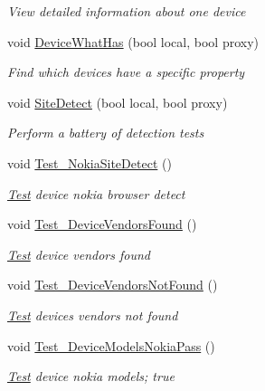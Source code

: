 \begin{DoxyCompactItemize}
\begin{DoxyCompactList}\small\item\em View detailed information about one device \end{DoxyCompactList}\item 
void \hyperlink{class_h_d3_1_1_test_1_1_h_d3_test_a60e604c7c80fe95810989db32be9a68c}{Device\+What\+Has} (bool local, bool proxy)
\begin{DoxyCompactList}\small\item\em Find which devices have a specific property \end{DoxyCompactList}\item 
void \hyperlink{class_h_d3_1_1_test_1_1_h_d3_test_a7574fbc39a251aa2d73b923c41612db5}{Site\+Detect} (bool local, bool proxy)
\begin{DoxyCompactList}\small\item\em Perform a battery of detection tests \end{DoxyCompactList}\item 
void \hyperlink{class_h_d3_1_1_test_1_1_h_d3_test_ac33dd7669508077165ee77c241904f6a}{Test\+\_\+\+Nokia\+Site\+Detect} ()
\begin{DoxyCompactList}\small\item\em \hyperlink{namespace_h_d3_1_1_test}{Test} device nokia browser detect \end{DoxyCompactList}\item 
void \hyperlink{class_h_d3_1_1_test_1_1_h_d3_test_abdbc11cf1956c40b5f0894f05654ec70}{Test\+\_\+\+Device\+Vendors\+Found} ()
\begin{DoxyCompactList}\small\item\em \hyperlink{namespace_h_d3_1_1_test}{Test} device vendors found \end{DoxyCompactList}\item 
void \hyperlink{class_h_d3_1_1_test_1_1_h_d3_test_a474e2044227b1931e1d29127b3e4e3be}{Test\+\_\+\+Device\+Vendors\+Not\+Found} ()
\begin{DoxyCompactList}\small\item\em \hyperlink{namespace_h_d3_1_1_test}{Test} devices vendors not found \end{DoxyCompactList}\item 
void \hyperlink{class_h_d3_1_1_test_1_1_h_d3_test_aa9cc42b177f48b4712f863e108c0a9f4}{Test\+\_\+\+Device\+Models\+Nokia\+Pass} ()
\begin{DoxyCompactList}\small\item\em \hyperlink{namespace_h_d3_1_1_test}{Test} device nokia models; true \end{DoxyCompactList}\item 

\end{DoxyCompactItemize}
